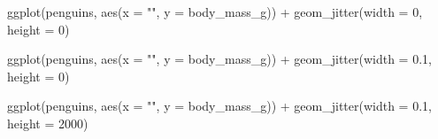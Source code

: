 \documentclass[
  a4paper,
  DIV=11,
  numbers=noendperiod,
  oneside]{scrreprt}
\newenvironment{Shaded}{}{}
\newcommand{\AttributeTok}[1]{\textcolor[rgb]{0.84,0.23,0.29}{#1}}
\newcommand{\DecValTok}[1]{\textcolor[rgb]{0.00,0.36,0.77}{#1}}
\newcommand{\FloatTok}[1]{\textcolor[rgb]{0.00,0.36,0.77}{#1}}
\newcommand{\FunctionTok}[1]{\textcolor[rgb]{0.44,0.26,0.76}{#1}}
\newcommand{\NormalTok}[1]{\textcolor[rgb]{0.14,0.16,0.18}{#1}}
\newcommand{\SpecialCharTok}[1]{\textcolor[rgb]{0.00,0.36,0.77}{#1}}
\newcommand{\StringTok}[1]{\textcolor[rgb]{0.01,0.18,0.38}{#1}}
\begin{document}
\begin{Shaded}
\begin{Highlighting}[]
\FunctionTok{ggplot}\NormalTok{(penguins, }\FunctionTok{aes}\NormalTok{(}\AttributeTok{x =} \StringTok{""}\NormalTok{, }\AttributeTok{y =}\NormalTok{ body\_mass\_g)) }\SpecialCharTok{+}
  \FunctionTok{geom\_jitter}\NormalTok{(}\AttributeTok{width =} \DecValTok{0}\NormalTok{, }\AttributeTok{height =} \DecValTok{0}\NormalTok{)}

\FunctionTok{ggplot}\NormalTok{(penguins, }\FunctionTok{aes}\NormalTok{(}\AttributeTok{x =} \StringTok{""}\NormalTok{, }\AttributeTok{y =}\NormalTok{ body\_mass\_g)) }\SpecialCharTok{+}
  \FunctionTok{geom\_jitter}\NormalTok{(}\AttributeTok{width =} \FloatTok{0.1}\NormalTok{, }\AttributeTok{height =} \DecValTok{0}\NormalTok{)}

\FunctionTok{ggplot}\NormalTok{(penguins, }\FunctionTok{aes}\NormalTok{(}\AttributeTok{x =} \StringTok{""}\NormalTok{, }\AttributeTok{y =}\NormalTok{ body\_mass\_g)) }\SpecialCharTok{+}
  \FunctionTok{geom\_jitter}\NormalTok{(}\AttributeTok{width =} \FloatTok{0.1}\NormalTok{, }\AttributeTok{height =} \DecValTok{2000}\NormalTok{)}
\end{Highlighting}
\end{Shaded}
\end{document}
